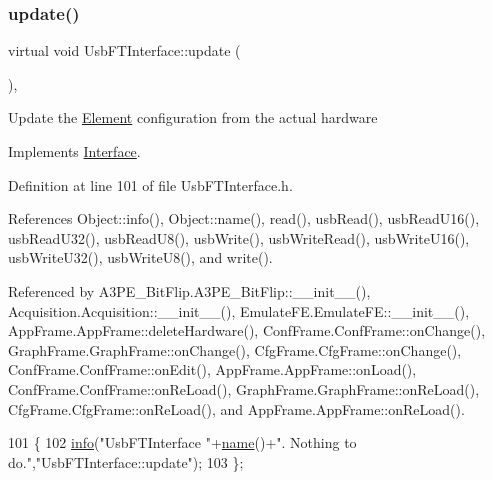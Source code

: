 \subsubsection{\texorpdfstring{update()}{update()}}
{\footnotesize\ttfamily virtual void Usb\+F\+T\+Interface\+::update (\begin{DoxyParamCaption}{ }\end{DoxyParamCaption})\hspace{0.3cm}{\ttfamily [inline]}, {\ttfamily [virtual]}}

Update the \hyperlink{classElement}{Element} configuration from the actual hardware 

Implements \hyperlink{classInterface_a30e71ffbe36091df9f7c0838dd4b60d2}{Interface}.



Definition at line 101 of file Usb\+F\+T\+Interface.\+h.



References Object\+::info(), Object\+::name(), read(), usb\+Read(), usb\+Read\+U16(), usb\+Read\+U32(), usb\+Read\+U8(), usb\+Write(), usb\+Write\+Read(), usb\+Write\+U16(), usb\+Write\+U32(), usb\+Write\+U8(), and write().



Referenced by A3\+P\+E\+\_\+\+Bit\+Flip.\+A3\+P\+E\+\_\+\+Bit\+Flip\+::\+\_\+\+\_\+init\+\_\+\+\_\+(), Acquisition.\+Acquisition\+::\+\_\+\+\_\+init\+\_\+\+\_\+(), Emulate\+F\+E.\+Emulate\+F\+E\+::\+\_\+\+\_\+init\+\_\+\+\_\+(), App\+Frame.\+App\+Frame\+::delete\+Hardware(), Conf\+Frame.\+Conf\+Frame\+::on\+Change(), Graph\+Frame.\+Graph\+Frame\+::on\+Change(), Cfg\+Frame.\+Cfg\+Frame\+::on\+Change(), Conf\+Frame.\+Conf\+Frame\+::on\+Edit(), App\+Frame.\+App\+Frame\+::on\+Load(), Conf\+Frame.\+Conf\+Frame\+::on\+Re\+Load(), Graph\+Frame.\+Graph\+Frame\+::on\+Re\+Load(), Cfg\+Frame.\+Cfg\+Frame\+::on\+Re\+Load(), and App\+Frame.\+App\+Frame\+::on\+Re\+Load().


\begin{DoxyCode}
101                          \{
102     \hyperlink{classObject_a644fd329ea4cb85f54fa6846484b84a8}{info}(\textcolor{stringliteral}{"UsbFTInterface "}+\hyperlink{classObject_a300f4c05dd468c7bb8b3c968868443c1}{name}()+\textcolor{stringliteral}{". Nothing to do."},\textcolor{stringliteral}{"UsbFTInterface::update"});
103   \};
\end{DoxyCode}
\mbox{\label{classUsbFTInterface_a2a63b462eb5831b4aef9d0f4c8d6ee1a}} 
